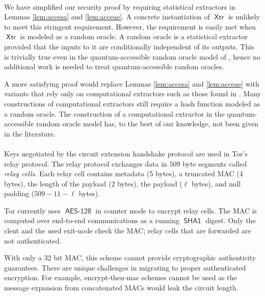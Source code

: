 \documentclass[USenglish,oneside,twocolumn]{article}
\theoremstyle{dgthm}
\theoremstyle{dgdef}
\newcommand{\AlgorithmName}[1]{\operatorname{\mathsf{#1}}}
\newcommand{\XTR}{\AlgorithmName{Xtr}}
\begin{document}
    \\
      We have simplified our security proof by requiring statistical extractors
      in Lemmas \ref{lem:accesa} and \ref{lem:acceae}. A concrete instantiation
      of $\XTR$ is unlikely to meet this stringent requirement. However, the
      requirement is easily met when $\XTR$ is modeled as a random oracle. A random
      oracle is a statistical extractor provided that the inputs to it are conditionally
      independent of its outputs. This is trivially true even in the quantum-accessible
      random oracle model of \cite{Boneh2011}, hence no additional work is needed to
      treat quantum-accessible random oracles.

      A more satisfying proof would replace Lemmas \ref{lem:accesa} and
      \ref{lem:acceae} with variants that rely only on computational extractors
      such as those found in \cite{Krawczyk2010}. Many constructions of
      computational extractors still require a hash function modeled as a
      random oracle. The construction of a computational extractor in the
      quantum-accessible random oracle model has, to the best of our knowledge,
      not been given in the literature.\\

    \\
      Keys negotiated by the circuit extension handshake protocol are used in
      Tor's relay protocol. The relay protocol exchanges data in $509$ byte
      segments called \emph{relay cells}.  Each relay cell contains metadata (5 bytes),
      a truncated MAC (4 bytes), the length of the payload (2 bytes), the payload ($\ell$ bytes),
      and null padding ($509 - 11 - \ell$ bytes).

      Tor currently uses $\AlgorithmName{AES-128}$ in counter mode to encrypt
      relay cells. The MAC is computed over end-to-end communications as a
      running $\AlgorithmName{SHA1}$ digest. Only the clent and the used
      exit-node check the MAC; relay cells that are forwarded are not
      authenticated.

      With only a $32$ bit MAC, this scheme cannot provide cryptographic
      authenticity guarantees. There are unique challenges in migrating to
      proper authenticated encryption. For example, encrypt-then-mac schemes
      cannot be used as the message expansion from concatenated MACs would leak
      the circuit length.
\end{document}
